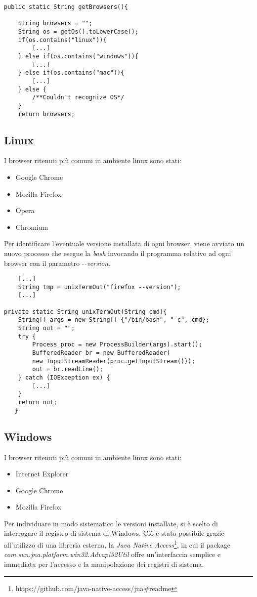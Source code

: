 \vspace{0.5cm}
\begin{lstlisting}
public static String getBrowsers(){

	String browsers = "";
	String os = getOs().toLowerCase();
	if(os.contains("linux")){
		[...]
	} else if(os.contains("windows")){
		[...]
	} else if(os.contains("mac")){
		[...]
	} else {
		/**Couldn't recognize OS*/
	}
	return browsers;
\end{lstlisting}

\subsection{Linux}
I browser ritenuti pi\`{u} comuni in ambiente linux sono stati:
\begin{itemize}
	\item Google Chrome
	\item Mozilla Firefox
	\item Opera
	\item Chromium
\end{itemize}
Per identificare l'eventuale versione installata di ogni browser, viene avviato un nuovo processo che esegue la \textit{bash} invocando il programma relativo ad ogni browser con il parametro -\textit{-version}.

\vspace{0.5cm}
\begin{lstlisting}
	[...]
	String tmp = unixTermOut("firefox --version");
	[...]

private static String unixTermOut(String cmd){
    String[] args = new String[] {"/bin/bash", "-c", cmd};
    String out = "";
    try {
	    Process proc = new ProcessBuilder(args).start();
	    BufferedReader br = new BufferedReader(
	    new InputStreamReader(proc.getInputStream()));
	    out = br.readLine();
    } catch (IOException ex) {
	    [...]
    }
    return out;
   }
\end{lstlisting}

\subsection{Windows}
I browser ritenuti pi\`{u} comuni in ambiente linux sono stati:
\begin{itemize}
	\item Internet Explorer
	\item Google Chrome
	\item Mozilla Firefox
\end{itemize}
Per individuare in modo sistematico le versioni installate, si \`{e} scelto di interrogare il registro di sistema di Windows.
Ci\`{o} \`{e} stato possibile grazie all'utilizzo di una libreria esterna, la
\textit{Java Native Access}\footnote{https://github.com/java-native-access/jna\#readme}, in cui il package \textit{com.sun.jna.platform.win32.Advapi32Util} offre un'interfaccia semplice e immediata per l'accesso e la manipolazione dei registri di sistema.

